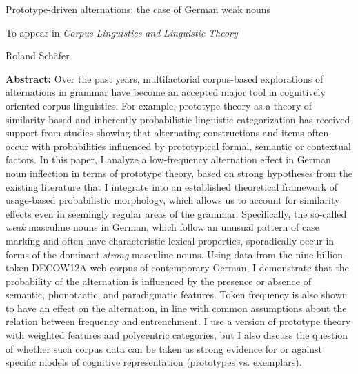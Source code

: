 

\begin{styleMoutonTitleStart}
Prototype-driven alternations: the case of German weak nouns
\end{styleMoutonTitleStart}

\begin{styleMoutonTitleEnd}
To appear in \textit{Corpus} \textit{Linguistics} \textit{and} \textit{Linguistic} \textit{Theory}
\end{styleMoutonTitleEnd}

\begin{styleMoutonAuthorStart}
Roland Schäfer
\end{styleMoutonAuthorStart}

\begin{styleMoutonAbstract}
\textbf{Abstract:} Over the past years, multifactorial corpus-based explorations of alternations in grammar have become an accepted major tool in cognitively oriented corpus linguistics. For example, prototype theory as a theory of similarity-based and inherently probabilistic linguistic categorization has received support from studies showing that alternating constructions and items often occur with probabilities influenced by prototypical formal, semantic or contextual factors. In this paper, I analyze a low-frequency alternation effect in German noun inflection in terms of prototype theory, based on strong hypotheses from the existing literature that I integrate into an established theoretical framework of usage-based probabilistic morphology, which allows us to account for similarity effects even in seemingly regular areas of the grammar. Specifically, the so-called \textit{weak} masculine nouns in German, which follow an unusual pattern of case marking and often have characteristic lexical properties, sporadically occur in forms of the dominant \textit{strong} masculine nouns. Using data from the nine-billion-token DECOW12A web corpus of contemporary German, I demonstrate that the probability of the alternation is influenced by the presence or absence of semantic, phonotactic, and paradigmatic features. Token frequency is also shown to have an effect on the alternation, in line with common assumptions about the relation between frequency and entrenchment. I use a version of prototype theory with weighted features and polycentric categories, but I also discuss the question of whether such corpus data can be taken as strong evidence for or against specific models of cognitive representation (prototypes vs. exemplars).
\end{styleMoutonAbstract}

